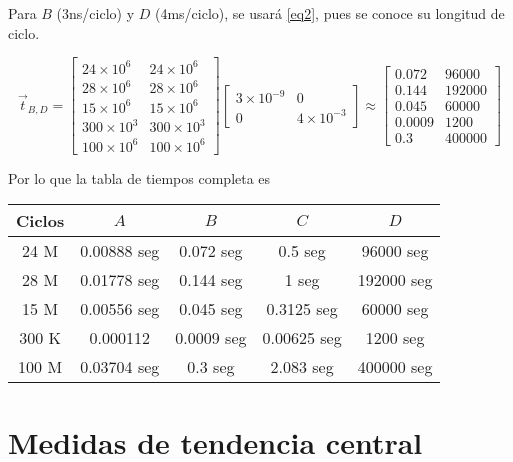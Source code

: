 \documentclass[]{article}
\begin{document}
    Para $B$ (3ns/ciclo) y $D$ (4ms/ciclo), se usará \eqref{eq2}, pues se conoce 
    su longitud de ciclo.

    \[
    \vec{t}_{B,D} = 
    \begin{bmatrix}
        24 \times 10^6 & 24 \times 10^6\\ 
        28 \times 10^6 & 28 \times 10^6\\
        15 \times 10^6 & 15 \times 10^6\\
        300 \times 10^3 & 300 \times 10^3\\
        100 \times 10^6 & 100 \times 10^6
    \end{bmatrix}    
    \begin{bmatrix}
        3 \times 10^{-9} & 0\\
        0 & 4 \times 10^{-3}
    \end{bmatrix}
    \approx
    \begin{bmatrix}
        0.072 & 96000 \\
        0.144 & 192000 \\
        0.045 & 60000 \\
        0.0009 & 1200 \\
        0.3 & 400000
    \end{bmatrix}
    \]

    Por lo que la tabla de tiempos completa es 
    \begin{table}[!h]
        \centering
        \begin{tabular}{|c|c|c|c|c|}
            \hline
            Ciclos & $A$ & $B$ & $C$ & $D$ \\
            \hline
            24 M & 0.00888 seg & 0.072 seg & 0.5 seg & 96000 seg \\
            28 M & 0.01778 seg & 0.144 seg & 1 seg & 192000 seg \\
            15 M & 0.00556 seg & 0.045 seg & 0.3125 seg & 60000 seg \\
            300 K & 0.000112 & 0.0009 seg & 0.00625 seg & 1200 seg \\
            100 M & 0.03704 seg & 0.3 seg & 2.083 seg & 400000 seg\\
            \hline
        \end{tabular}
    \end{table}

    \section{
        Medidas de tendencia central
    }
\end{document}

